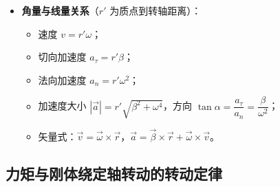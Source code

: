 \documentclass[12pt,a4paper]{ctexart}
\begin{document}
\begin{itemize}
    \item \textbf{角量与线量关系}（$r'$ 为质点到转轴距离）：
    \begin{itemize}
        \item 速度 $v = r'\omega$；
        \item 切向加速度 $a_\tau = r'\beta$；
        \item 法向加速度 $a_n = r'\omega^2$；
        \item 加速度大小 $|\vec{a}| = r'\sqrt{\beta^2 + \omega^4}$，方向 $\tan\alpha = \dfrac{a_\tau}{a_n} = \dfrac{\beta}{\omega^2}$；
        \item 矢量式：$\vec{v} = \vec{\omega}\times\vec{r}$，$\vec{a} = \vec{\beta}\times\vec{r} + \vec{\omega}\times\vec{v}$。
    \end{itemize}
\end{itemize}

\subsection{力矩与刚体绕定轴转动的转动定律}
\end{document}
